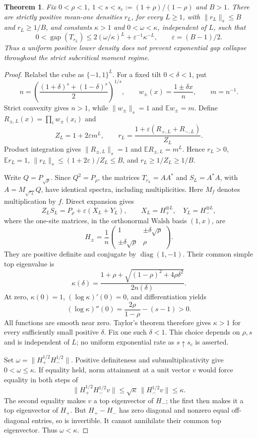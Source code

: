 \documentclass[11pt]{article}
\newtheorem{theorem}{Theorem}
\newcommand{\diag}{\operatorname{diag}}
\newcommand{\gap}{\operatorname{gap}}
\begin{document}
\begin{theorem}\label{thm:tilts}
Fix $0<\rho<1$, $1<s<s_c:=(1+\rho)/(1-\rho)$ and $B>1$.
There are strictly positive mean-one densities $r_L$, for every $L\ge1$,
with $\|r_L\|_s\le B$ and $r_L\ge1/B$, and constants
$\kappa>1$ and $0<\omega<\kappa$, independent of $L$, such that
\[
 0<\gap(T_{r_L})\le
 2(\omega/\kappa)^L+\varepsilon^{-1}\kappa^{-L},
 \qquad \varepsilon=(B-1)/2.
\]
Thus a uniform positive lower density does not prevent exponential gap
collapse throughout the strict subcritical moment regime.
\end{theorem}
\begin{proof}
Relabel the cube as $\{-1,1\}^L$. For a fixed tilt $0<\delta<1$, put
\[
 n=\left(\frac{(1+\delta)^s+(1-\delta)^s}{2}\right)^{1/s},
 \qquad w_\pm(x)=\frac{1\pm\delta x}{n},\qquad m=n^{-1}.
\]
Strict convexity gives $n>1$, while $\|w_\pm\|_s=1$ and
$\mathbb E w_\pm=m$. Define $R_{\pm,L}(x)=\prod_i w_\pm(x_i)$ and
\[
 Z_L=1+2\varepsilon m^L,\qquad
 r_L=\frac{1+\varepsilon(R_{+,L}+R_{-,L})}{Z_L}.
\]
Product integration gives $\|R_{\pm,L}\|_s=1$ and
$\mathbb E R_{\pm,L}=m^L$. Hence $r_L>0$, $\mathbb E r_L=1$,
$\|r_L\|_s\le(1+2\varepsilon)/Z_L\le B$, and
$r_L\ge1/Z_L\ge1/B$.

Write $Q=P_{\sqrt\rho}$. Since $Q^2=P_\rho$, the matrices
$T_{r_L}=AA^*$ and $S_L=A^*A$, with $A=M_{\sqrt{r_L}}Q$,
have identical spectra, including multiplicities. Here $M_f$ denotes
multiplication by $f$. Direct expansion gives
\[
 Z_L S_L=P_\rho+\varepsilon(X_L+Y_L),\qquad
 X_L=H_+^{\otimes L},\quad Y_L=H_-^{\otimes L},
\]
where the one-site matrices, in the orthonormal Walsh basis $(1,x)$, are
\[
 H_\pm=\frac1n
 \begin{pmatrix}1&\pm\delta\sqrt\rho\\
                 \pm\delta\sqrt\rho&\rho\end{pmatrix}.
\]
They are positive definite and conjugate by $\diag(1,-1)$. Their common
simple top eigenvalue is
\[
 \kappa(\delta)=
 \frac{1+\rho+\sqrt{(1-\rho)^2+4\rho\delta^2}}{2n(\delta)}.
\]
At zero, $\kappa(0)=1$, $(\log\kappa)'(0)=0$, and differentiation yields
\[
 (\log\kappa)''(0)=\frac{2\rho}{1-\rho}-(s-1)>0.
\]
All functions are smooth near zero. Taylor's theorem therefore gives
$\kappa>1$ for every sufficiently small positive $\delta$. Fix one such
$\delta<1$. This choice depends on $\rho,s$ and is independent of $L$;
no uniform exponential rate as $s\uparrow s_c$ is asserted.

Set $\omega=\|H_+^{1/2}H_-^{1/2}\|$. Positive definiteness and
submultiplicativity give $0<\omega\le\kappa$. If equality held, norm
attainment at a unit vector $v$ would force equality in both steps of
\[
 \|H_+^{1/2}H_-^{1/2}v\|
 \le\sqrt\kappa\,\|H_-^{1/2}v\|\le\kappa.
\]
The second equality makes $v$ a top eigenvector of $H_-$; the first
then makes it a top eigenvector of $H_+$. But $H_+-H_-$ has zero
diagonal and nonzero equal off-diagonal entries, so is invertible.
It cannot annihilate their common top eigenvector. Thus $\omega<\kappa$.


\end{proof}
\end{document}
